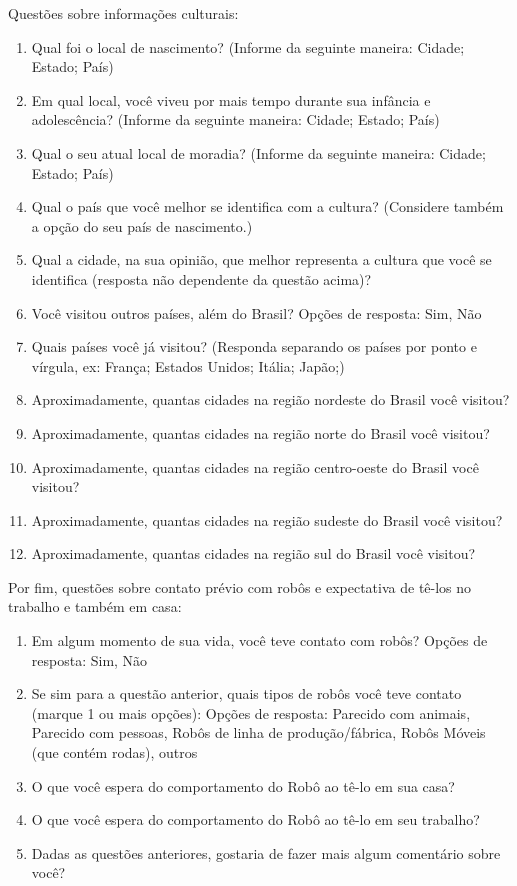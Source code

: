 Questões sobre informações culturais:

\begin{enumerate}
	\item Qual foi o local de nascimento? (Informe da seguinte maneira: Cidade; Estado; País)
	\item Em qual local, você viveu por mais tempo durante sua infância e adolescência? (Informe da seguinte maneira: Cidade; Estado; País)
	\item Qual o seu atual local de moradia? (Informe da seguinte maneira: Cidade; Estado; País)
	\item Qual o país que você melhor se identifica com a cultura? (Considere também a opção do seu país de nascimento.)
	\item Qual a cidade, na sua opinião, que melhor representa a cultura que você se identifica (resposta não dependente da questão acima)?
	\item Você visitou outros países, além do Brasil? Opções de resposta: Sim, Não
	\item Quais países você já visitou? (Responda separando os países por ponto e vírgula, ex: França; Estados Unidos; Itália; Japão;)
	\item Aproximadamente, quantas cidades na região nordeste do Brasil você visitou?
	\item Aproximadamente, quantas cidades na região norte do Brasil você visitou?
	\item Aproximadamente, quantas cidades na região centro-oeste do Brasil você visitou?
	\item Aproximadamente, quantas cidades na região sudeste do Brasil você visitou?
	\item Aproximadamente, quantas cidades na região sul do Brasil você visitou?
\end{enumerate}

Por fim, questões sobre contato prévio com robôs e expectativa de tê-los no trabalho e também em casa:

\begin{enumerate}
	\item Em algum momento de sua vida, você teve contato com robôs? Opções de resposta: Sim, Não
	\item Se sim para a questão anterior, quais tipos de robôs você teve contato (marque 1 ou mais opções): Opções de resposta: Parecido com animais, Parecido com pessoas, Robôs de linha de produção/fábrica, Robôs Móveis (que contém rodas), outros
	\item O que você espera do comportamento do Robô ao tê-lo em sua casa?
	\item O que você espera do comportamento do Robô ao tê-lo em seu trabalho?
	\item Dadas as questões anteriores, gostaria de fazer mais algum comentário sobre você?
\end{enumerate}

